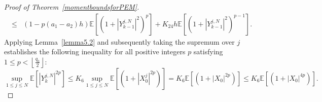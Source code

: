 \documentclass[12pt]{article}
\numberwithin{equation}{section}
\begin{document}
\begin{proof}[Proof of Theorem~\ref{momentboundsforPEM}]
\begin{equation}
\begin{aligned}
\leq&\left(1-p\left(a_1-a_2\right) h\right)\mathbb{E}\left[\left(1+\left|Y^{j,N}_{k-1}\right|^2\right)^p\right]+K_{24} h\mathbb{E}\left[\left(1+\left|Y^{j,N}_{k-1}\right|^2\right)^{p-1}\right].
\end{aligned}
\end{equation}
Applying Lemma~\ref{lemma5.2} and subsequently taking the supremum over $j$ establishes the following inequality for all positive integers $p$ satisfying $1 \leq p < \left\lfloor \frac{q_0}{2} \right\rfloor$:
\begin{equation}\tag{5.82}\label{5.82}
\underset{1\leqslant j\leqslant N}{\sup}\mathbb{E}\left[\left|Y^{j,N}_k\right|^{2 p}\right] \leq K_6 \underset{1\leqslant j\leqslant N}{\sup}\mathbb{E}\left[\left(1+\left|X_0^{j}\right|^{2 p}\right)\right]= K_6\mathbb{E}\left[\left(1+\left|X_0\right|^{2 p}\right)\right]\leq K_6\mathbb{E}\left[\left(1+\left|X_0\right|^{4 p}\right)\right].
\end{equation}


\end{proof}
\end{document}
